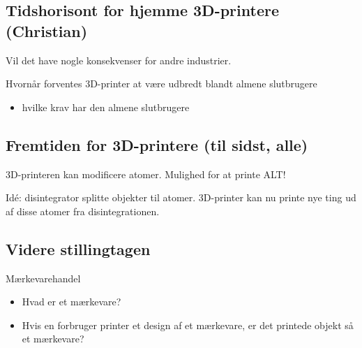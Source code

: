 

\subsection{Tidshorisont for hjemme 3D-printere (Christian)} %
\label{sub:tidshorisont_for_hjemme_3d_printere_senere_}

Vil det have nogle konsekvenser for andre industrier.

Hvornår forventes 3D-printer at være udbredt blandt almene slutbrugere

\begin{itemize}
	\item hvilke krav har den almene slutbrugere
\end{itemize}


\subsection{Fremtiden for 3D-printere (til sidst, alle)} %
\label{sub:fremtiden_for_3d_printere_til_sidst_alle_}

3D-printeren kan modificere atomer. Mulighed for at printe ALT!

Idé: disintegrator splitte objekter til atomer. 3D-printer kan nu printe nye ting ud af disse atomer fra disintegrationen.


\subsection{Videre stillingtagen} %
\label{sub:videre_stillingtagen}

Mærkevarehandel

\begin{itemize}
	\item Hvad er et mærkevare?
	\item Hvis en forbruger printer et design af et mærkevare, er det printede objekt så et mærkevare?
	
\end{itemize}




